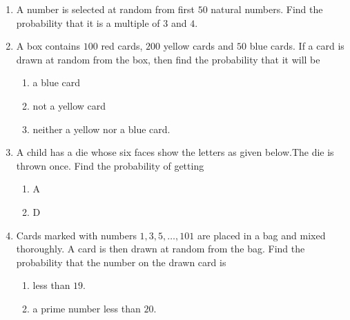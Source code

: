 \documentclass[journal,12pt,onecolumn]{IEEEtran}
\theoremstyle{remark}
\begin{document}
\begin{enumerate}
\item A number is selected at random from first $50$ natural numbers. Find the probability that it is a multiple of $3$ and $4$. 
\item A box contains $100$ red cards, $200$ yellow cards and $50$ blue cards. If a card is drawn at random from the box, then find the probability that it will be \begin{enumerate}[label=\Roman*.]
\item a blue card
\item not a yellow card
\item neither a yellow nor a blue card. 
\end{enumerate}

\item A child has a die whose six faces show the letters as given below.The die is thrown once. Find the probability of getting 
\begin{figure}[ht]
\centering
{}
\end{figure}
\begin{enumerate}[label=\Roman*.]
\item A 
\item D 
\end{enumerate}
\item Cards marked with numbers $1,3,5, \ldots, 101$ are placed in a bag and mixed thoroughly. A card is then drawn at random from the bag. Find the probability that the number on the drawn card is 
\begin{enumerate}[label=\Roman*.]
\item less than $19$.
\item a prime number less than $20$. 
\end{enumerate}
\end{enumerate}
\end{document}
